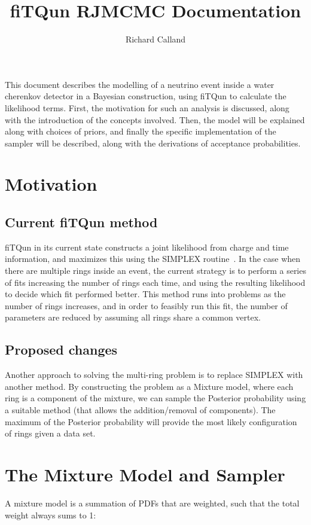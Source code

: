 \documentclass[11pt]{article} %
\title{fiTQun RJMCMC Documentation}
\author{Richard Calland}
\begin{document}
\maketitle
This document describes the modelling of a  neutrino event inside a water cherenkov detector in a Bayesian construction, using fiTQun to calculate the likelihood terms. First, the motivation for such an analysis is discussed, along with the introduction of the concepts involved. Then, the model will be explained along with choices of priors, and finally the specific implementation of the sampler will  be described, along with the derivations of acceptance probabilities.

\section{Motivation}
\subsection{Current fiTQun method}
fiTQun in its current state constructs a joint likelihood from charge and time information, and maximizes this using the SIMPLEX routine~\cite{SIMPLEX}. In the case when there are multiple rings inside an event, the current strategy is to perform a series of fits increasing the number of rings each time, and using the resulting likelihood to decide which fit performed better. This method runs into problems as the number of rings increases, and in order to feasibly run this fit, the number of parameters are reduced by assuming all rings share a common vertex.

\subsection{Proposed changes}
Another approach to solving the multi-ring problem is to replace SIMPLEX with another method. By constructing the problem as a Mixture model, where each ring is a component of the mixture, we can sample the Posterior probability using a suitable method (that allows the addition/removal of components). The maximum of the Posterior probability will provide the most likely configuration of rings given a data set.

\section{The Mixture Model and Sampler}
A mixture model is a summation of PDFs that are weighted, such that the total weight always sums to 1: 
\end{document}
